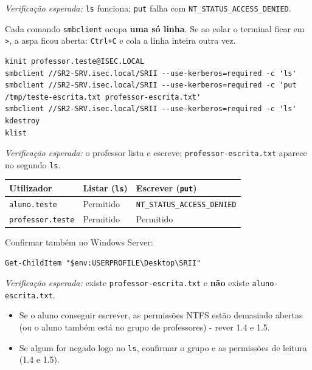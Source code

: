 \emph{Verificação esperada:} \texttt{ls} funciona; \texttt{put} falha com \texttt{NT\_STATUS\_ACCESS\_DENIED}.

\begin{dicabox}[title={Dica}]
Cada comando \texttt{smbclient} ocupa \textbf{uma só linha}. Se ao colar o terminal ficar em \texttt{\textgreater{}}, a aspa ficou aberta: \texttt{Ctrl+C} e cola a linha inteira outra vez.
\end{dicabox}


\begin{lstlisting}[style=bashstyle]
kinit professor.teste@ISEC.LOCAL
smbclient //SR2-SRV.isec.local/SRII --use-kerberos=required -c 'ls'
smbclient //SR2-SRV.isec.local/SRII --use-kerberos=required -c 'put /tmp/teste-escrita.txt professor-escrita.txt'
smbclient //SR2-SRV.isec.local/SRII --use-kerberos=required -c 'ls'
kdestroy
klist
\end{lstlisting}

\emph{Verificação esperada:} o professor lista e escreve; \texttt{professor-escrita.txt} aparece no segundo \texttt{ls}.


\begin{center}\small
\begin{tabularx}{\linewidth}{|>{\raggedright\arraybackslash}X|>{\raggedright\arraybackslash}X|>{\raggedright\arraybackslash}X|}
\hline
\rowcolor{azul!10}\textbf{Utilizador} & \textbf{Listar (\texttt{ls})} & \textbf{Escrever (\texttt{put})} \\
\hline
\texttt{aluno.teste} & Permitido & \texttt{NT\_STATUS\_ACCESS\_DENIED} \\
\hline
\texttt{professor.teste} & Permitido & Permitido \\
\hline
\end{tabularx}
\end{center}

Confirmar também no Windows Server:

\begin{lstlisting}[style=psstyle]
Get-ChildItem "$env:USERPROFILE\Desktop\SRII"
\end{lstlisting}

\emph{Verificação esperada:} existe \texttt{professor-escrita.txt} e \textbf{não} existe \texttt{aluno-escrita.txt}.

\begin{itemize}
\item Se o aluno conseguir escrever, as permissões NTFS estão demasiado abertas (ou o aluno também está no grupo de professores) - rever 1.4 e 1.5.
\item Se algum for negado logo no \texttt{ls}, confirmar o grupo e as permissões de leitura (1.4 e 1.5).
\end{itemize}

